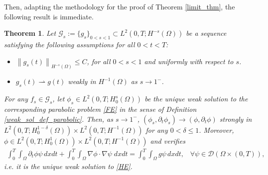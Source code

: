 \documentclass[reqno,twoside]{amsart}
\newtheorem{theorem}{Theorem}[section]
\numberwithin{equation}{section}
\newcommand{\norm}[2]{{\left\|#1\right\|}_{#2}}
\begin{document}
Then, adapting the methodology for the proof of Theorem \eqref{limit_thm}, the following result is immediate.

\begin{theorem}\label{limit_thm_parabolic}
	Let $\mathcal{G}_s:=\{g_s\}_{0<s<1}\subset L^2(0,T;H^{-s}(\Omega))$ be a sequence satisfying the following assumptions for all $0<t<T$:
	\begin{itemize}
		\item[$\textbf{K1}$] $\norm{g_s(t)}{H^{-s}(\Omega)}\leq C$, for all $0<s<1$ and uniformly with respect to $s$.
		
		\item[$\textbf{K2}$] $g_s(t)\rightharpoonup g(t)$ weakly in $H^{-1}(\Omega)$ as $s\to 1^-$.
	\end{itemize}		
For any $f_s\in\mathcal{G}_s$, let $\phi_s\in L^2(0,T;H^s_0(\Omega))$ be the unique weak solution to the corresponding parabolic problem \eqref{FE} in the sense of Definition \ref{weak_sol_def_parabolic}. Then, as $s\to 1^-$, $(\phi_s,\partial_t\phi_s)\to(\phi,\partial_t\phi)$ strongly in $L^2(0,T;H^{1-\delta}_0(\Omega))\times L^2(0,T;H^{-1}(\Omega))$ for any $0<\delta\leq 1$. Moreover, $\phi\in L^2(0,T;H^1_0(\Omega))\times L^2(0,T;H^{-1}(\Omega))$ and verifies
\begin{align*}
	\int_0^T \int_\Omega\partial_t\phi\psi\,dxdt + \int_0^T\int_\Omega \nabla\phi\cdot\nabla\psi\;dxdt = \int_0^T\int_\Omega g\psi\,dxdt, \;\;\; \forall\psi\in\mathcal{D}(\Omega\times(0,T)),
\end{align*}
i.e. it is the unique weak solution to \eqref{HE}.
\end{theorem}
\end{document}
